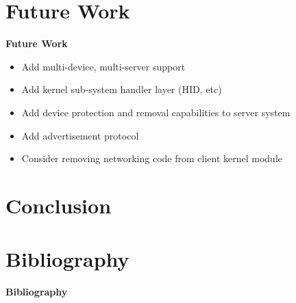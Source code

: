 \documentclass[xcolor=dvipsnames]{beamer}
\begin{document}
\section{Future Work}
\begin{frame}{\bf Future Work}

\begin{itemize}
\item Add multi-device, multi-server support
\item Add kernel sub-system handler layer (HID, etc)
\item Add device protection and removal capabilities to server system
\item Add advertisement protocol
\item Consider removing networking code from client kernel module
\end{itemize}

\end{frame}

\section{Conclusion}

\section{Bibliography}
\begin{frame}{\bf Bibliography}



\end{frame}
\end{document}
